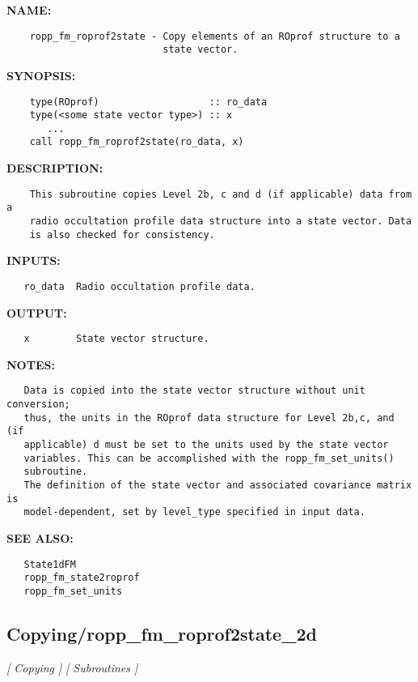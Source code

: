\label{ch:robo31}
\label{ch:Copying_ropp_fm_roprof2state}
\textbf{NAME:}\hspace{0.08in}\begin{Verbatim}
    ropp_fm_roprof2state - Copy elements of an ROprof structure to a 
                           state vector.
\end{Verbatim}
\textbf{SYNOPSIS:}\hspace{0.08in}\begin{Verbatim}
    type(ROprof)                   :: ro_data
    type(<some state vector type>) :: x
       ...
    call ropp_fm_roprof2state(ro_data, x)
\end{Verbatim}
\textbf{DESCRIPTION:}\hspace{0.08in}\begin{Verbatim}
    This subroutine copies Level 2b, c and d (if applicable) data from a
    radio occultation profile data structure into a state vector. Data
    is also checked for consistency.
\end{Verbatim}
\textbf{INPUTS:}\hspace{0.08in}\begin{Verbatim}
   ro_data  Radio occultation profile data.
\end{Verbatim}
\textbf{OUTPUT:}\hspace{0.08in}\begin{Verbatim}
   x        State vector structure.
\end{Verbatim}
\textbf{NOTES:}\hspace{0.08in}\begin{Verbatim}
   Data is copied into the state vector structure without unit conversion;
   thus, the units in the ROprof data structure for Level 2b,c, and (if
   applicable) d must be set to the units used by the state vector 
   variables. This can be accomplished with the ropp_fm_set_units()
   subroutine.
   The definition of the state vector and associated covariance matrix is 
   model-dependent, set by level_type specified in input data.
\end{Verbatim}
\textbf{SEE ALSO:}\hspace{0.08in}\begin{Verbatim}
   State1dFM
   ropp_fm_state2roprof
   ropp_fm_set_units
\end{Verbatim}
\subsection{Copying/ropp\_fm\_roprof2state\_2d}
\textsl{[ Copying ]}
\textsl{[ Subroutines ]}

